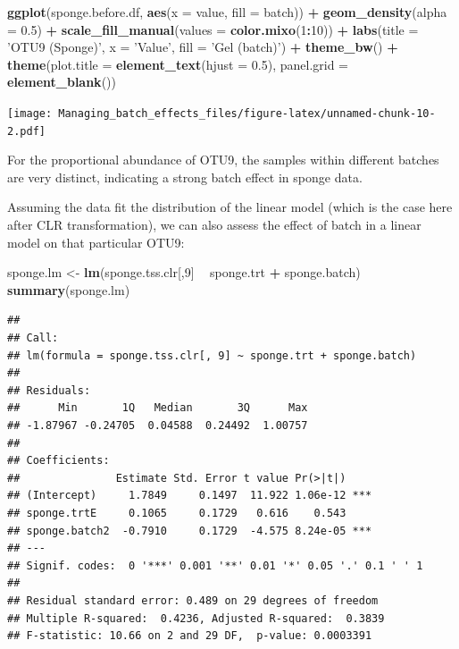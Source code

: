 \documentclass[]{book}
\newenvironment{Shaded}{\begin{snugshade}}{\end{snugshade}}
\newcommand{\KeywordTok}[1]{\textcolor[rgb]{0.13,0.29,0.53}{\textbf{#1}}}
\newcommand{\DataTypeTok}[1]{\textcolor[rgb]{0.13,0.29,0.53}{#1}}
\newcommand{\DecValTok}[1]{\textcolor[rgb]{0.00,0.00,0.81}{#1}}
\newcommand{\FloatTok}[1]{\textcolor[rgb]{0.00,0.00,0.81}{#1}}
\newcommand{\StringTok}[1]{\textcolor[rgb]{0.31,0.60,0.02}{#1}}
\newcommand{\OperatorTok}[1]{\textcolor[rgb]{0.81,0.36,0.00}{\textbf{#1}}}
\newcommand{\NormalTok}[1]{#1}
\begin{document}
\begin{Shaded}
\begin{Highlighting}[]
\KeywordTok{ggplot}\NormalTok{(sponge.before.df, }\KeywordTok{aes}\NormalTok{(}\DataTypeTok{x =}\NormalTok{ value, }\DataTypeTok{fill =}\NormalTok{ batch)) }\OperatorTok{+}\StringTok{ }
\StringTok{  }\KeywordTok{geom_density}\NormalTok{(}\DataTypeTok{alpha =} \FloatTok{0.5}\NormalTok{) }\OperatorTok{+}\StringTok{ }\KeywordTok{scale_fill_manual}\NormalTok{(}\DataTypeTok{values =} \KeywordTok{color.mixo}\NormalTok{(}\DecValTok{1}\OperatorTok{:}\DecValTok{10}\NormalTok{)) }\OperatorTok{+}\StringTok{ }
\StringTok{  }\KeywordTok{labs}\NormalTok{(}\DataTypeTok{title =} \StringTok{'OTU9 (Sponge)'}\NormalTok{, }\DataTypeTok{x =} \StringTok{'Value'}\NormalTok{, }\DataTypeTok{fill =} \StringTok{'Gel (batch)'}\NormalTok{) }\OperatorTok{+}\StringTok{ }
\StringTok{  }\KeywordTok{theme_bw}\NormalTok{() }\OperatorTok{+}\StringTok{ }\KeywordTok{theme}\NormalTok{(}\DataTypeTok{plot.title =} \KeywordTok{element_text}\NormalTok{(}\DataTypeTok{hjust =} \FloatTok{0.5}\NormalTok{), }
                     \DataTypeTok{panel.grid =} \KeywordTok{element_blank}\NormalTok{())}
\end{Highlighting}
\end{Shaded}

\texttt{[image: Managing\_batch\_effects\_files/figure-latex/unnamed-chunk-10-2.pdf]}

For the proportional abundance of OTU9, the samples within different
batches are very distinct, indicating a strong batch effect in sponge
data.

Assuming the data fit the distribution of the linear model (which is the
case here after CLR transformation), we can also assess the effect of
batch in a linear model on that particular OTU9:

\begin{Shaded}
\begin{Highlighting}[]
\NormalTok{sponge.lm <-}\StringTok{ }\KeywordTok{lm}\NormalTok{(sponge.tss.clr[,}\DecValTok{9}\NormalTok{] }\OperatorTok{~}\StringTok{ }\NormalTok{sponge.trt }\OperatorTok{+}\StringTok{ }\NormalTok{sponge.batch)}
\KeywordTok{summary}\NormalTok{(sponge.lm)}
\end{Highlighting}
\end{Shaded}

\begin{verbatim}
## 
## Call:
## lm(formula = sponge.tss.clr[, 9] ~ sponge.trt + sponge.batch)
## 
## Residuals:
##      Min       1Q   Median       3Q      Max 
## -1.87967 -0.24705  0.04588  0.24492  1.00757 
## 
## Coefficients:
##               Estimate Std. Error t value Pr(>|t|)    
## (Intercept)     1.7849     0.1497  11.922 1.06e-12 ***
## sponge.trtE     0.1065     0.1729   0.616    0.543    
## sponge.batch2  -0.7910     0.1729  -4.575 8.24e-05 ***
## ---
## Signif. codes:  0 '***' 0.001 '**' 0.01 '*' 0.05 '.' 0.1 ' ' 1
## 
## Residual standard error: 0.489 on 29 degrees of freedom
## Multiple R-squared:  0.4236, Adjusted R-squared:  0.3839 
## F-statistic: 10.66 on 2 and 29 DF,  p-value: 0.0003391
\end{verbatim}
\end{document}
